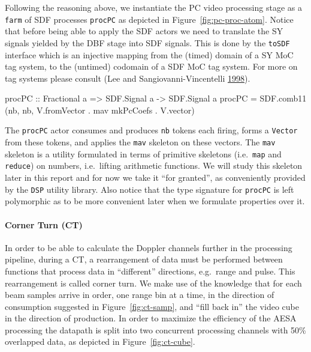 \documentclass[
  a4paper,
]{article}
\newenvironment{Shaded}{}{}
\newcommand{\DataTypeTok}[1]{\textcolor[rgb]{0.56,0.13,0.00}{#1}}
\newcommand{\FunctionTok}[1]{\textcolor[rgb]{0.02,0.16,0.49}{#1}}
\newcommand{\NormalTok}[1]{#1}
\newcommand{\OtherTok}[1]{\textcolor[rgb]{0.00,0.44,0.13}{#1}}
\let\oldparagraph\paragraph
\renewcommand{\paragraph}[1]{\oldparagraph{#1}\mbox{}}
\begin{document}
Following the reasoning above, we instantiate the PC video processing
stage as a \texttt{farm} of SDF processes \texttt{procPC} as depicted in
Figure~\ref{fig:pc-proc-atom}. Notice that before being able to apply
the SDF actors we need to translate the SY signals yielded by the DBF
stage into SDF signals. This is done by the \texttt{toSDF} interface
which is an injective mapping from the (timed) domain of a SY MoC tag
system, to the (untimed) codomain of a SDF MoC tag system. For more on
tag systems please consult (Lee and Sangiovanni-Vincentelli
\protect\hyperlink{ref-lee98}{1998}).

\begin{Shaded}
\begin{Highlighting}[numbers=left,,firstnumber=229,]
\OtherTok{procPC ::} \DataTypeTok{Fractional}\NormalTok{ a }\OtherTok{=>} \DataTypeTok{SDF.Signal}\NormalTok{ a }\OtherTok{->} \DataTypeTok{SDF.Signal}\NormalTok{ a }
\NormalTok{procPC }\FunctionTok{=}\NormalTok{ SDF.comb11 (nb, nb, V.fromVector }\FunctionTok{.}\NormalTok{ mav mkPcCoefs }\FunctionTok{.}\NormalTok{ V.vector)}
\end{Highlighting}
\end{Shaded}

The \texttt{procPC} actor consumes and produces \texttt{nb} tokens each
firing, forms a \texttt{Vector} from these tokens, and applies the
\texttt{mav} skeleton on these vectors. The \texttt{mav} skeleton is a
utility formulated in terms of primitive skeletons (i.e.~\texttt{map}
and \texttt{reduce}) on numbers, i.e.~lifting arithmetic functions. We
will study this skeleton later in this report and for now we take it
``for granted'', as conveniently provided by the \texttt{DSP} utility
library. Also notice that the type signature for \texttt{procPC} is left
polymorphic as to be more convenient later when we formulate properties
over it.

\hypertarget{corner-turn-ct}{%
\paragraph{Corner Turn (CT)}\label{corner-turn-ct}}

In order to be able to calculate the Doppler channels further in the
processing pipeline, during a CT, a rearrangement of data must be
performed between functions that process data in ``different''
directions, e.g.~range and pulse. This rearrangement is called corner
turn. We make use of the knowledge that for each beam samples arrive in
order, one range bin at a time, in the direction of consumption
suggested in Figure~\ref{fig:ct-samp}, and ``fill back in'' the video
cube in the direction of production. In order to maximize the efficiency
of the AESA processing the datapath is split into two concurrent
processing channels with 50\% overlapped data, as depicted in
Figure~\ref{fig:ct-cube}.
\end{document}
